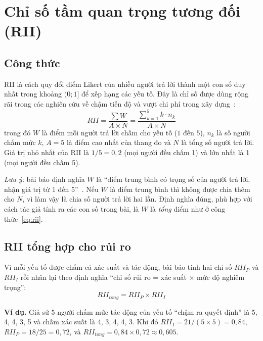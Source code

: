 \section{Chỉ số tầm quan trọng tương đối (RII)}
\label{sec:rii}

\subsection{Công thức}

RII là cách quy đổi điểm Likert của nhiều người trả lời thành một con số duy nhất trong khoảng $(0;1]$ để xếp hạng các yếu tố. Đây là chỉ số được dùng rộng rãi trong các nghiên cứu về chậm tiến độ và vượt chi phí trong xây dựng~\cite{sambasivan2007}:
\begin{equation}
RII = \frac{\sum W}{A \times N} = \frac{\sum_{k=1}^{5} k \cdot n_k}{A \times N}
\label{eq:rii}
\end{equation}
trong đó $W$ là điểm mỗi người trả lời chấm cho yếu tố ($1$ đến $5$), $n_k$ là số người chấm mức $k$, $A = 5$ là điểm cao nhất của thang đo và $N$ là tổng số người trả lời. Giá trị nhỏ nhất của RII là $1/5 = 0{,}2$ (mọi người đều chấm 1) và lớn nhất là 1 (mọi người đều chấm 5).

\emph{Lưu ý:} bài báo định nghĩa $W$ là ``điểm trung bình có trọng số của người trả lời, nhận giá trị từ 1 đến 5''~\cite{kassem2022}. Nếu $W$ là điểm trung bình thì không được chia thêm cho $N$, vì làm vậy là chia số người trả lời hai lần. Định nghĩa đúng, phù hợp với cách tác giả tính ra các con số trong bài, là $W$ là \emph{tổng} điểm như ở công thức~\eqref{eq:rii}.

\subsection{RII tổng hợp cho rủi ro}

Vì mỗi yếu tố được chấm cả xác suất và tác động, bài báo tính hai chỉ số $RII_P$ và $RII_I$ rồi nhân lại theo định nghĩa ``chỉ số rủi ro = xác suất $\times$ mức độ nghiêm trọng'':
\begin{equation}
RII_{tong} = RII_P \times RII_I
\label{eq:rii-tong}
\end{equation}

\textbf{Ví dụ.} Giả sử 5 người chấm mức tác động của yếu tố ``chậm ra quyết định'' là 5, 4, 4, 3, 5 và chấm xác suất là 4, 3, 4, 4, 3. Khi đó $RII_I = 21/(5 \times 5) = 0{,}84$, $RII_P = 18/25 = 0{,}72$, và $RII_{tong} = 0{,}84 \times 0{,}72 \approx 0{,}605$.

